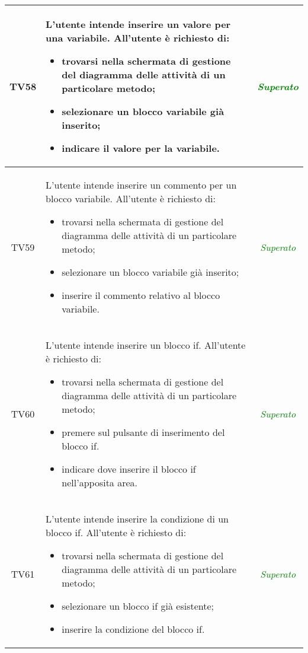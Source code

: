 \begin{longtable}{|c|>{}m{8cm}|c|}
\hypertarget{TV4.1.4}{TV58} & L'utente intende inserire un valore per una variabile.
All'utente è richiesto di:
\begin{itemize}
	\item trovarsi nella schermata di gestione del diagramma delle attività di un particolare metodo;
	\item selezionare un blocco variabile già inserito;
	\item indicare il valore per la variabile.
\end{itemize} & \textcolor{Green}{\textit{Superato}}\\ \hline


\hypertarget{TV4.1.3}{TV59} & L'utente intende inserire un commento per un blocco variabile.
All'utente è richiesto di:
\begin{itemize}
	\item trovarsi nella schermata di gestione del diagramma delle attività di un particolare metodo;
	\item selezionare un blocco variabile già inserito;
	\item inserire il commento relativo al blocco variabile.
\end{itemize} & \textcolor{Green}{\textit{Superato}}\\ \hline

\hypertarget{TV4.3}{TV60} & L'utente intende inserire un blocco if.
All'utente è richiesto di:
\begin{itemize}
	\item trovarsi nella schermata di gestione del diagramma delle attività di un particolare metodo;
	\item premere sul pulsante di inserimento del blocco if.
	\item indicare dove inserire il blocco if nell'apposita area.
\end{itemize} & \textcolor{Green}{\textit{Superato}}\\ \hline

\hypertarget{TV4.3.1}{TV61} & L'utente intende inserire la condizione di un blocco if.
All'utente è richiesto di:
\begin{itemize}
	\item trovarsi nella schermata di gestione del diagramma delle attività di un particolare metodo;
	\item selezionare un blocco if già esistente;
	\item inserire la condizione del blocco if.
\end{itemize} & \textcolor{Green}{\textit{Superato}}\\ \hline


\end{longtable}
